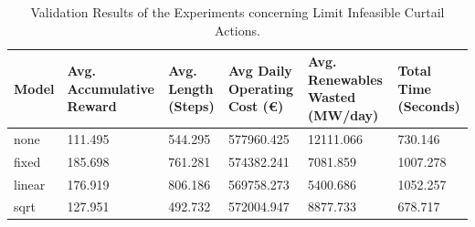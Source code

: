 \begin{table}[ht]
	\centering
	\begin{tabularx}{\textwidth}{|l|X|X|X|X|X|}
		\hline
		\textbf{Model} & \textbf{Avg. Accumulative Reward}& \textbf{Avg. Length (Steps)} & \textbf{Avg Daily Operating Cost (€)} & \textbf{Avg. Renewables Wasted (MW/day)} & \textbf{Total Time (Seconds)}\\
		\hline
		none & 111.495 & 544.295 & 577960.425 & 12111.066 & 730.146 \\
		fixed & 185.698 & 761.281 & 574382.241 & 7081.859 & 1007.278 \\
		linear & 176.919 & 806.186 & 569758.273 & 5400.686 & 1052.257 \\
		sqrt & 127.951 &  492.732 & 572004.947 & 8877.733 & 678.717 \\
		\hline
	\end{tabularx}
	\caption{Validation Results of the Experiments concerning Limit Infeasible Curtail Actions.}
	\label{fig:curtail-val}
\end{table}

